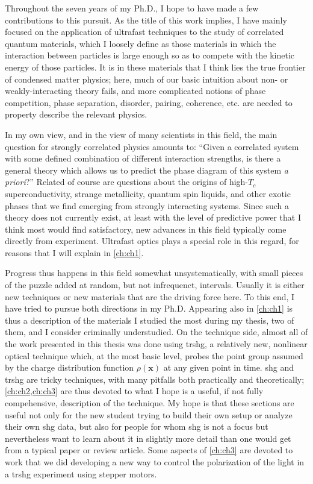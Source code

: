 Throughout the seven years of my Ph.D., I hope to have made a few contributions to this pursuit.
As the title of this work implies, I have mainly focused on the application of ultrafast techniques to the study of correlated quantum materials, which I loosely define as those materials in which the interaction between particles is large enough so as to compete with the kinetic energy of those particles.
It is in these materials that I think lies the true frontier of condensed matter physics; here, much of our basic intuition about non- or weakly-interacting theory fails, and more complicated notions of phase competition, phase separation, disorder, pairing, coherence, etc. are needed to property describe the relevant physics.

In my own view, and in the view of many scientists in this field\citep{alexandradinata_future_2022}, the main question for strongly correlated physics amounts to: ``Given a correlated system with some defined combination of different interaction strengths, is there a general theory which allows us to predict the phase diagram of this system \textit{a priori}?''
Related of course are questions about the origins of high-$T_c$ superconductivity, strange metallicity, quantum spin liquids, and other exotic phases that we find emerging from strongly interacting systems.
Since such a theory does not currently exist, at least with the level of predictive power that I think most would find satisfactory, new advances in this field typically come directly from experiment.
Ultrafast optics plays a special role in this regard, for reasons that I will explain in \cref{ch:ch1}.

Progress thus happens in this field somewhat unsystematically, with small pieces of the puzzle added at random, but not infrequenct, intervals.
Usually it is either new techniques or new materials that are the driving force here.
To this end, I have tried to pursue both directions in my Ph.D.
Appearing also in \cref{ch:ch1} is thus a description of the materials I studied the most during my thesis, two of them,  and  I consider criminally understudied.
On the technique side, almost all of the work presented in this thesis was done using \gls{trshg}, a relatively new, nonlinear optical technique which, at the most basic level, probes the point group assumed by the charge distribution function $\rho(\bm{x})$ at any given point in time.
\Gls{shg} and \gls{trshg} are tricky techniques, with many pitfalls both practically and theoretically; \cref{ch:ch2,ch:ch3} are thus devoted to what I hope is a useful, if not fully compehensive, description of the technique.
My hope is that these sections are useful not only for the new student trying to build their own setup or analyze their own \gls{shg} data, but also for people for whom \gls{shg} is not a focus but nevertheless want to learn about it in slightly more detail than one would get from a typical paper or review article.
Some aspects of \cref{ch:ch3} are devoted to work that we did developing a new way to control the polarization of the light in a \gls{trshg} experiment using stepper motors.

